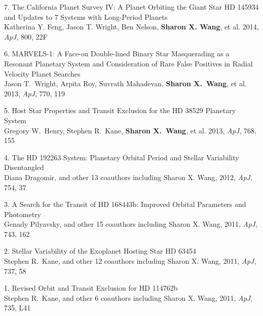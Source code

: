 \begin{small}
7. The California Planet Survey IV: A Planet Orbiting the Giant Star
HD 145934 and Updates to 7 Systems with Long-Period Planets\\ 
Katherina Y. Feng, Jason T. Wright, Ben Nelson, \textbf{Sharon
  X. Wang}, et al.
2014, {\it ApJ}, 800, 22F


6. MARVELS-1: A Face-on Double-lined Binary Star Masquerading as a
Resonant Planetary System and Consideration of Rare False Positives in
Radial Velocity Planet Searches \\
Jason T.~Wright, Arpita Roy, Suvrath Mahadevan, \textbf{Sharon X.~Wang}, et al.
2013, {\it ApJ}, 770, 119


5. Host Star Properties and Transit Exclusion for the HD 38529
Planetary System \\
Gregory W.\ Henry, Stephen R.\ Kane, {\bf Sharon X.\ Wang}, et al. 2013, {\it ApJ}, 768, 155


4. The HD 192263 System: Planetary Orbital Period and Stellar Variability Disentangled \\
Diana Dragomir, and other 13 coauthors including Sharon X. Wang, 2012, {\it ApJ}, 754, 37


3. A Search for the Transit of HD 168443b: Improved Orbital Parameters and Photometry \\
Genady Pilyavsky, and other 15 coauthors including Sharon X. Wang, 2011, {\it ApJ}, 743, 162


2. Stellar Variability of the Exoplanet Hosting Star HD 63454 \\ 
Stephen R.\ Kane, and other 12 coauthors including Sharon X. Wang, 2011, {\it ApJ}, 737,  58


1. Revised Orbit and Transit Exclusion for HD 114762b \\
Stephen R.\ Kane, and other 6 coauthors including Sharon X. Wang, 2011, {\it ApJ}, 735,  L41



\end{small}
